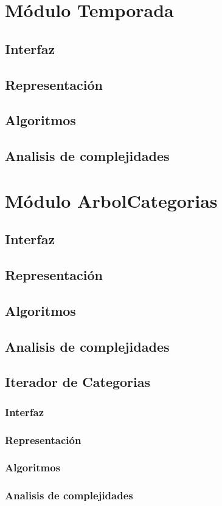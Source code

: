 \documentclass[12pt, a4paper]{article}
\begin{document}
\maketitle
\tableofcontents
\newpage

\section{Módulo Temporada} 
\subsection{Interfaz}

\subsection{Representaci\'on}

\subsection{Algoritmos}

\subsection{Analisis de complejidades}


\section{Módulo ArbolCategorias} 
\subsection{Interfaz}

\subsection{Representaci\'on}

\subsection{Algoritmos}

\subsection{Analisis de complejidades}


\subsection{Iterador de Categorias} 
\subsubsection{Interfaz}

\subsubsection{Representaci\'on}

\subsubsection{Algoritmos}

\subsubsection{Analisis de complejidades}


\newpage
\end{document}

